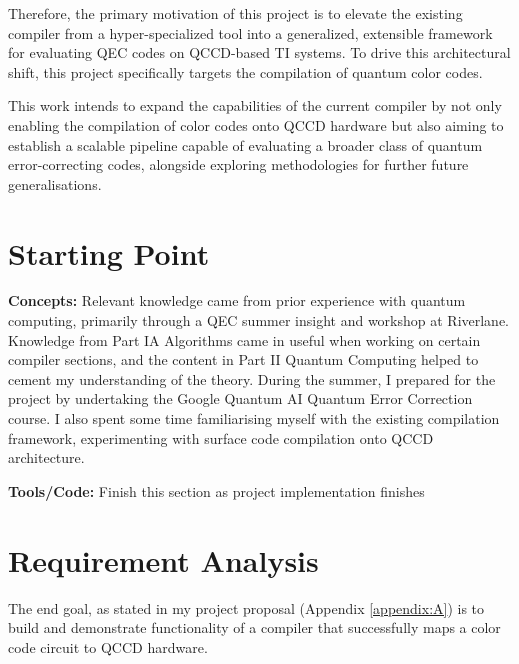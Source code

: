 Therefore, the primary motivation of this project is to elevate the existing compiler from a hyper-specialized tool into a generalized, extensible framework for evaluating QEC codes on QCCD-based TI systems. To drive this architectural shift, this project specifically targets the compilation of quantum color codes.

This work intends to expand the capabilities of the current compiler by not only enabling the compilation of color codes onto QCCD hardware but also aiming to establish a scalable pipeline capable of evaluating a broader class of quantum error-correcting codes, alongside exploring methodologies for further future generalisations. 

\section{Starting Point}
\textbf{Concepts:} Relevant knowledge came from prior experience with quantum computing, primarily through a QEC summer insight and workshop at Riverlane. Knowledge from Part IA Algorithms came in useful when working on certain compiler sections, and the content in Part II Quantum Computing helped to cement my understanding of the theory. During the summer, I prepared for the project by undertaking the Google Quantum AI Quantum Error Correction course. I also spent some time familiarising myself with the existing compilation framework, experimenting with surface code compilation onto QCCD architecture. 

\textbf{Tools/Code:}
Finish this section as project implementation finishes

\section{Requirement Analysis}

The end goal, as stated in my project proposal (Appendix \ref{appendix:A}) is to build and demonstrate functionality of a compiler that successfully maps a color code circuit to QCCD hardware.

